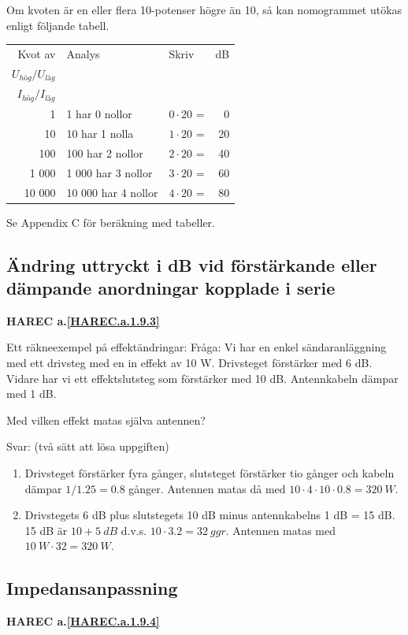 Om kvoten är en eller flera 10-potenser högre än 10, så kan nomogrammet utökas
enligt följande tabell.

\begin{tabular}{rllr}
Kvot av & Analys             & Skriv            & dB \\
\(U_{hög}/U_{låg}\) &          &                  &    \\
\(I_{hög}/I_{låg}\) &          &                  &    \\
     1 & 1 har 0 nollor      & \(0 \cdot 20\) = &  0 \\
    10 & 10 har 1 nolla      & \(1 \cdot 20\) = & 20 \\
   100 & 100 har 2 nollor    & \(2 \cdot 20\) = & 40 \\
 1 000 &  1 000 har 3 nollor & \(3 \cdot 20\) = & 60 \\
10 000 & 10 000 har 4 nollor & \(4 \cdot 20\) = & 80
\end{tabular}

Se Appendix C för beräkning med tabeller.

\subsection{Ändring uttryckt i dB vid förstärkande eller dämpande anordningar kopplade i serie}
\textbf{HAREC a.\ref{HAREC.a.1.9.3}\label{myHAREC.a.1.9.3}}

Ett räkneexempel på effektändringar:
Fråga:
Vi har en enkel sändaranläggning med ett drivsteg med en in effekt av 10 W.
Drivsteget förstärker med 6 dB. Vidare har vi ett effektslutsteg som förstärker
med 10 dB. Antennkabeln dämpar med 1 dB.

Med vilken effekt matas själva antennen?

Svar: (två sätt att lösa uppgiften)
\begin{enumerate}
\item Drivsteget förstärker fyra gånger, slutsteget förstärker tio gånger och
kabeln dämpar \(1/1.25 = 0.8\) gånger. Antennen matas då med
\(10 \cdot 4 \cdot 10 \cdot 0.8 = 320\ W\).
\item Drivstegets 6 dB plus slutstegets 10 dB minus antennkabelns 1 dB = 15 dB.
15 dB är \(10 + 5\ dB\) d.v.s. \(10 \cdot 3.2 = 32\ ggr\). Antennen matas med
\(10\ W \cdot 32 = 320\ W\).
\end{enumerate}

\subsection{Impedansanpassning}
\textbf{HAREC a.\ref{HAREC.a.1.9.4}\label{myHAREC.a.1.9.4}}

